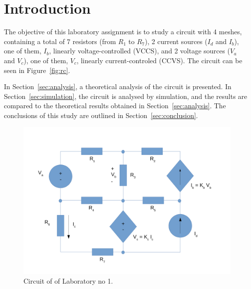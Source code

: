 \section{Introduction}
\label{sec:introduction}

The objective of this laboratory assignment is to study a circuit with 4 meshes, containing a total of 7 resistors (from $R_1$ to $R_7$), 2 current sources ($I_d$ and $I_b$), one of them, $I_b$, linearly voltage-controlled (VCCS), and 2 voltage sources ($V_a$ and $V_c$), one of them, $V_c$, linearly current-controled (CCVS). The circuit can be seen in Figure~\ref{fig:rc}.

In Section~\ref{sec:analysis}, a theoretical analysis of the circuit is
presented. In Section~\ref{sec:simulation}, the circuit is analysed by
simulation, and the results are compared to the theoretical results obtained in
Section~\ref{sec:analysis}. The conclusions of this study are outlined in
Section~\ref{sec:conclusion}.

\begin{figure}[h] \centering
\includegraphics[width=0.4\linewidth]{circuit_intro.pdf}
\caption{Circuit of of Laboratory no 1.}
\end{figure}

